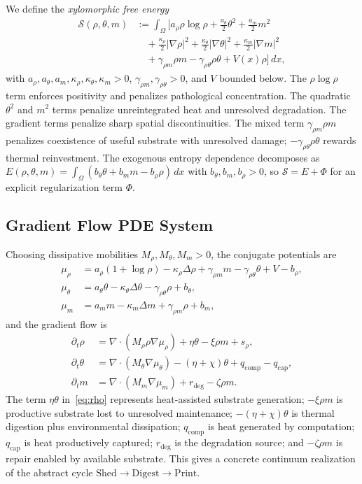 \documentclass[10pt,twocolumn]{article}
\theoremstyle{plain}
\theoremstyle{definition}
\theoremstyle{remark}
\begin{document}
We define the \emph{xylomorphic free energy}
\begin{align*}
\mathcal{S}(\rho,\theta,m) &:= \int_\Omega \Big[
  a_\rho \rho \log \rho
  + \tfrac{a_\theta}{2}\theta^2
  + \tfrac{a_m}{2}m^2 \\
&\quad + \tfrac{\kappa_\rho}{2}|\nabla\rho|^2
  + \tfrac{\kappa_\theta}{2}|\nabla\theta|^2
  + \tfrac{\kappa_m}{2}|\nabla m|^2 \\
&\quad + \gamma_{\rho m}\rho m
  - \gamma_{\rho\theta}\rho\theta
  + V(x)\rho \Big]\,dx,
\end{align*}
with $a_\rho, a_\theta, a_m, \kappa_\rho, \kappa_\theta, \kappa_m > 0$,
$\gamma_{\rho m}, \gamma_{\rho\theta} > 0$, and $V$ bounded below.
The $\rho \log \rho$ term enforces positivity and penalizes pathological
concentration. The quadratic $\theta^2$ and $m^2$ terms penalize
unreintegrated heat and unresolved degradation. The gradient terms
penalize sharp spatial discontinuities. The mixed term
$\gamma_{\rho m} \rho m$ penalizes coexistence of useful substrate with
unresolved damage; $-\gamma_{\rho\theta}\rho\theta$ rewards thermal
reinvestment. The exogenous entropy dependence decomposes as
$E(\rho,\theta,m) = \int_\Omega (b_\theta\theta + b_m m -
b_\rho\rho)\,dx$ with $b_\theta, b_m, b_\rho > 0$, so
$\mathcal{S} = E + \Phi$ for an explicit regularization term $\Phi$.

\subsection{Gradient Flow PDE System}

Choosing dissipative mobilities $M_\rho, M_\theta, M_m > 0$, the
conjugate potentials are
\begin{align*}
\mu_\rho &= a_\rho(1+\log\rho) - \kappa_\rho\Delta\rho
  + \gamma_{\rho m}m - \gamma_{\rho\theta}\theta + V - b_\rho,\\
\mu_\theta &= a_\theta\theta - \kappa_\theta\Delta\theta
  - \gamma_{\rho\theta}\rho + b_\theta,\\
\mu_m &= a_m m - \kappa_m\Delta m + \gamma_{\rho m}\rho + b_m,
\end{align*}
and the gradient flow is
\begin{align}
\partial_t \rho &= \nabla\cdot(M_\rho\rho\nabla\mu_\rho)
  + \eta\theta - \xi\rho m + s_\rho, \label{eq:rho}\\
\partial_t \theta &= \nabla\cdot(M_\theta\nabla\mu_\theta)
  - (\eta+\chi)\theta + q_{\mathrm{comp}} - q_{\mathrm{cap}}, \label{eq:theta}\\
\partial_t m &= \nabla\cdot(M_m\nabla\mu_m)
  + r_{\mathrm{deg}} - \zeta\rho m. \label{eq:m}
\end{align}
The term $\eta\theta$ in~\eqref{eq:rho} represents heat-assisted
substrate generation; $-\xi\rho m$ is productive substrate lost to
unresolved maintenance; $-(\eta+\chi)\theta$ is thermal digestion plus
environmental dissipation; $q_{\mathrm{comp}}$ is heat generated by
computation; $q_{\mathrm{cap}}$ is heat productively captured;
$r_{\mathrm{deg}}$ is the degradation source; and $-\zeta\rho m$ is
repair enabled by available substrate. This gives a concrete continuum
realization of the abstract cycle $\mathrm{Shed} \to \mathrm{Digest}
\to \mathrm{Print}$.
\end{document}
